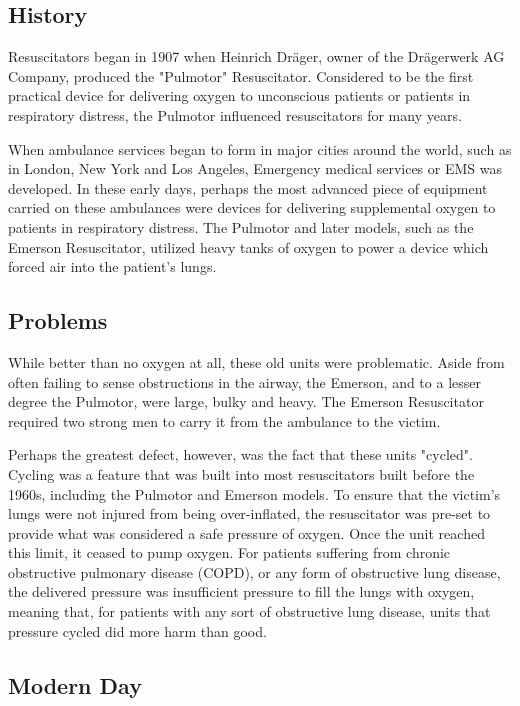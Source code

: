 \documentclass[12pt]{article}
\begin{document}
\subsection{History}

Resuscitators began in 1907 when Heinrich Dräger, owner of the Drägerwerk AG Company, produced the "Pulmotor" Resuscitator. Considered to be the first practical device for delivering oxygen to unconscious patients or patients in respiratory distress, the Pulmotor influenced resuscitators for many years.


When ambulance services began to form in major cities around the world, such as in London, New York and Los Angeles, Emergency medical services or EMS was developed. In these early days, perhaps the most advanced piece of equipment carried on these ambulances were devices for delivering supplemental oxygen to patients in respiratory distress. The Pulmotor and later models, such as the Emerson Resuscitator, utilized heavy tanks of oxygen to power a device which forced air into the patient's lungs.


\subsection{Problems}

While better than no oxygen at all, these old units were problematic. Aside from often failing to sense obstructions in the airway, the Emerson, and to a lesser degree the Pulmotor, were large, bulky and heavy. The Emerson Resuscitator required two strong men to carry it from the ambulance to the victim.


Perhaps the greatest defect, however, was the fact that these units "cycled". Cycling was a feature that was built into most resuscitators built before the 1960s, including the Pulmotor and Emerson models. To ensure that the victim's lungs were not injured from being over-inflated, the resuscitator was pre-set to provide what was considered a safe pressure of oxygen. Once the unit reached this limit, it ceased to pump oxygen. For patients suffering from chronic obstructive pulmonary disease (COPD), or any form of obstructive lung disease, the delivered pressure was insufficient pressure to fill the lungs with oxygen, meaning that, for patients with any sort of obstructive lung disease, units that pressure cycled did more harm than good.


\subsection{Modern Day}
\end{document}
